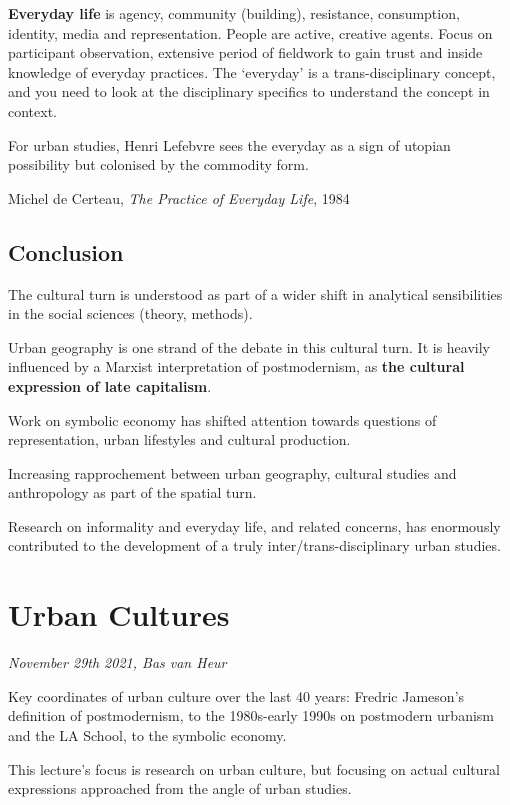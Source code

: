 \documentclass{article}
\begin{document}
\textbf{Everyday life} is agency, community (building), resistance, consumption, identity, media and representation.
People are active, creative agents. Focus on participant observation, extensive period of fieldwork to gain trust and inside knowledge of everyday practices.
The `everyday' is a trans-disciplinary concept, and you need to look at the disciplinary specifics to understand the concept in context. 

For urban studies, Henri Lefebvre sees the everyday as a sign of utopian possibility but colonised by the commodity form.

Michel de Certeau, \textit{The Practice of Everyday Life}, 1984

\subsection{Conclusion}

The cultural turn is understood as part of a wider shift in analytical sensibilities in the social sciences (theory, methods).

Urban geography is one strand of the debate in this cultural turn. It is heavily influenced by a Marxist interpretation of postmodernism, as \textbf{the cultural expression of late capitalism}.

Work on symbolic economy has shifted attention towards questions of representation, urban lifestyles and cultural production. 

Increasing rapprochement between urban geography, cultural studies and anthropology as part of the spatial turn.

Research on informality and everyday life, and related concerns, has enormously contributed to the development of a truly inter/trans-disciplinary urban studies.


\section{Urban Cultures}
\textit{November 29th 2021, Bas van Heur}

Key coordinates of urban culture over the last 40 years: Fredric Jameson's definition of postmodernism, to the 1980s-early 1990s on postmodern urbanism and the LA School, to the symbolic economy.

This lecture's focus is research on urban culture, but focusing on actual cultural expressions approached from the angle of urban studies.
\end{document}
